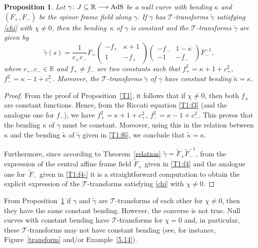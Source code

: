 \documentclass[10pt,a4paper]{amsart}
\numberwithin{equation}{section}
\newtheorem{Proposition}[Theorem]{Proposition}
 { \theoremstyle{definition}
\newtheorem{Definition}[Theorem]{Definition}
\newtheorem{Note}[Theorem]{Note}
\newtheorem{Example}[Theorem]{Example}
\newtheorem{Remark}[Theorem]{Remark} }
\def\bending{\kappa}
\def\R{\mathbb{R}}
\def\AdS{{\rm AdS}}
\begin{document}
\begin{Proposition}\label{5.5} Let $\gamma\colon J \subseteq \R\longrightarrow \AdS$ be a null curve with bending $\bending$ and $(F_+,F_-)$ be the spinor frame field along $\gamma$. If $\gamma$ has $\mathcal{T}$-transforms $\widetilde{\gamma}$ satisfying \eqref{chi} with $\chi\neq 0$, then the bending~$\bending$ of $\gamma$ is constant and the $\mathcal{T}$-transforms $\widetilde{\gamma}$ are given by
\begin{equation*}\widetilde{\gamma}(s)=\frac{1}{c_+c_-}F_+\begin{pmatrix}-f_+&\bending+1\\1&-f_+\end{pmatrix}\begin{pmatrix}-f_-&1-\bending\\-1&-f_-\end{pmatrix}F_-^{-1},\end{equation*}
	where $c_+,c_-\in\R$ and $f_+\neq f_-$ are two constants such that
$f_+^2=\bending+1+c_+^2$, $f_-^2=\bending-1+c_-^2$.
Moreover, the $\mathcal{T}$-transforms $\widetilde{\gamma}$ of $\gamma$ have constant bending $\widetilde{\bending}=\bending$.
\end{Proposition}
\begin{proof} From the proof of Proposition~\ref{T1}, it follows that if $\chi\neq 0$, then both $f_{\pm}$ are constant functions. Hence, from the Riccati equation \eqref{T1:f3} (and the analogue one for $f_-$), we have
$f_+^2=\bending+ 1+c_+^2$, $f_-^2=\bending-1+c_-^2$.
	This proves that the bending $\bending$ of $\gamma$ must be constant. Moreover, using this in the relation between $\bending$ and the bending $\widetilde{\bending}$ of $\widetilde{\gamma}$ given in \eqref{T1:f6}, we conclude that $\widetilde{\bending}=\bending$.
	
	Furthermore, since according to Theorem~\ref{relation} $\widetilde{\gamma}=\widetilde{F}_+\widetilde{F}_-^{-1}$,
	from the expression of the central affine frame field $\widetilde{F}_+$ given in \eqref{T1:f4} and the analogue one for~$\widetilde{F}_-$ given in \eqref{T1:f4-} it is a straightforward computation to obtain the explicit expression of the $\mathcal{T}$-transforms satisfying \eqref{chi} with $\chi\neq 0$.
\end{proof}

\begin{Remark} From Proposition~\ref{5.5} if $\gamma$ and $\widetilde{\gamma}$ are $\mathcal{T}$-transforms of each other for $\chi\neq 0$, then they have the same constant bending. However, the converse is not true. Null curves with constant bending have $\mathcal{T}$-transforms for $\chi=0$ and, in particular, these $\mathcal{T}$-transforms may not have constant bending (see, for instance, Figure~\ref{transform} and/or Example~\ref{5.14}).
\end{Remark}
\end{document}
